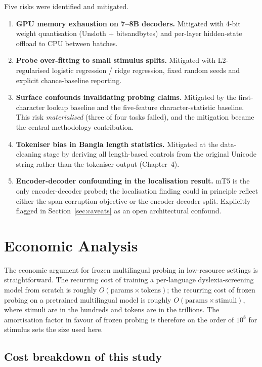 Five risks were identified and mitigated.

\begin{enumerate}
    \item \textbf{GPU memory exhaustion on 7--8B decoders.} Mitigated with 4-bit weight quantisation (Unsloth + bitsandbytes) and per-layer hidden-state offload to CPU between batches.
    \item \textbf{Probe over-fitting to small stimulus splits.} Mitigated with L2-regularised logistic regression / ridge regression, fixed random seeds and explicit chance-baseline reporting.
    \item \textbf{Surface confounds invalidating probing claims.} Mitigated by the first-character lookup baseline and the five-feature character-statistic baseline. This risk \emph{materialised} (three of four tasks failed), and the mitigation became the central methodology contribution.
    \item \textbf{Tokeniser bias in Bangla length statistics.} Mitigated at the data-cleaning stage by deriving all length-based controls from the original Unicode string rather than the tokeniser output (Chapter~4).
    \item \textbf{Encoder-decoder confounding in the localisation result.} mT5 is the only encoder-decoder probed; the localisation finding could in principle reflect either the span-corruption objective or the encoder-decoder split. Explicitly flagged in Section~\ref{sec:caveats} as an open architectural confound.
\end{enumerate}

\section{Economic Analysis}
\label{sec:economic}

The economic argument for frozen multilingual probing in low-resource settings is straightforward. The recurring cost of training a per-language dyslexia-screening model from scratch is roughly $O(\text{params} \times \text{tokens})$; the recurring cost of frozen probing on a pretrained multilingual model is roughly $O(\text{params} \times \text{stimuli})$, where stimuli are in the hundreds and tokens are in the trillions. The amortisation factor in favour of frozen probing is therefore on the order of $10^{8}$ for stimulus sets the size used here.

\subsection*{Cost breakdown of this study}

